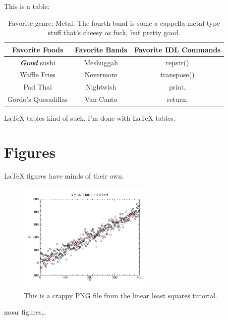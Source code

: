 \documentclass[12pt,letterpaper]{article}
\begin{document}
This is a table:

\begin{table}[H]
    \centering
    \begin{tabular}{|c|c|c|}
        \hline
        Favorite Foods & Favorite Bands & Favorite IDL Commands \\
        \hline
        \textit{\textbf{Good}} sushi & Meshuggah & repstr() \\
        Waffle Fries & Nevermore & transpose() \\
        Pad Thai & Nightwish & print, \\
        Gordo's Quesadillas & Van Canto & return, \\
        \hline
    \end{tabular}
    \caption{Favorite genre: Metal. The fourth band is some a cappella
    metal-type stuff that's cheesy as fuck, but pretty good.}
\end{table}

LaTeX tables kind of suck. I'm done with LaTeX tables.

\section{Figures}

LaTeX figures have minds of their own.

\begin{figure}[H]
    \centering
    \includegraphics[width=0.6\textwidth]{lls-tut.png}
    \caption{This is a crappy PNG file from the linear least squares tutorial.}
\end{figure}

moar figures\dots
\end{document}
